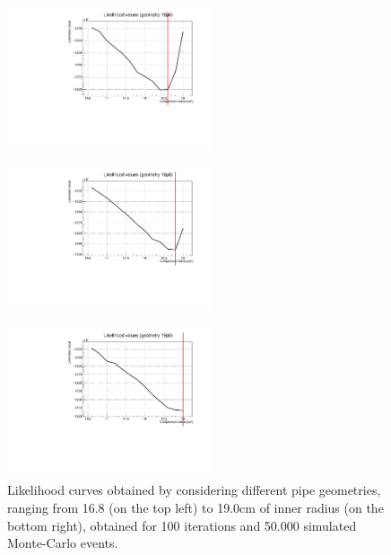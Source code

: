 \documentclass[a4paper, 11pt, twoside, openright]{report}
\begin{document}
\begin{figure}[htbp]
\begin{minipage}[b]{.32\textwidth}
\includegraphics[width=6cm, height=4.6cm]{figs/likelihood100HighStat/likelihood18p6.pdf}
\end{minipage}\hfill
\begin{minipage}[b]{.32\textwidth}
\includegraphics[width=6cm, height=4.6cm]{figs/likelihood100HighStat/likelihood18p8.pdf}
\end{minipage} \hfill
\begin{minipage}[b]{.32\textwidth}
\includegraphics[width=6cm, height=4.6cm]{figs/likelihood100HighStat/likelihood19p0.pdf}
\end{minipage} \hfill
\caption{Likelihood curves obtained by considering different pipe geometries, ranging from 16.8 (on the top left) to 19.0cm of inner radius (on the bottom right), obtained for 100 iterations and 50.000 simulated Monte-Carlo events.}
\label{fig:likelihoods2}
\end{figure}
\end{document}
